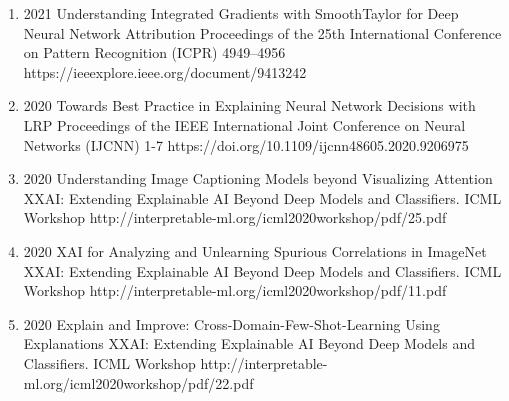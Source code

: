 {\begin{enumerate}
        \item {}
                                {2021}
                                {Understanding Integrated Gradients with SmoothTaylor for Deep Neural Network Attribution}
                                {Proceedings of the 25th International Conference on Pattern Recognition (ICPR)}
                                {4949--4956}
                                {https://ieeexplore.ieee.org/document/9413242}

        \item {}
                                {2020}
                                {Towards Best Practice in Explaining Neural Network Decisions with LRP}
                                {Proceedings of the IEEE International Joint Conference on Neural Networks (IJCNN)}
                                {1-7}
                                {https://doi.org/10.1109/ijcnn48605.2020.9206975}

        \item {}
                                {2020}
                                {Understanding Image Captioning Models beyond Visualizing Attention}
                                {XXAI: Extending Explainable AI Beyond Deep Models and Classifiers. ICML Workshop}
                                {}
                                {http://interpretable-ml.org/icml2020workshop/pdf/25.pdf}


        \item {}
                                {2020}
                                {XAI for Analyzing and Unlearning Spurious Correlations in ImageNet}
                                {XXAI: Extending Explainable AI Beyond Deep Models and Classifiers. ICML Workshop}
                                {}
                                {http://interpretable-ml.org/icml2020workshop/pdf/11.pdf}


        \item {}
                                {2020}
                                {Explain and Improve: Cross-Domain-Few-Shot-Learning Using Explanations}
                                {XXAI: Extending Explainable AI Beyond Deep Models and Classifiers. ICML Workshop}
                                {}
                                {http://interpretable-ml.org/icml2020workshop/pdf/22.pdf}



\end{enumerate}}
